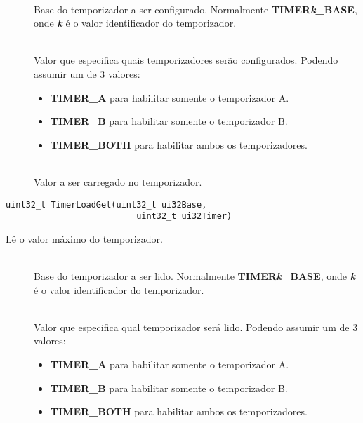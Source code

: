 \begin{description}
	\item []\hfill \\
	Base do temporizador a ser configurado. Normalmente \textbf{TIMER\emph{k}\_BASE}, onde \textbf{\emph{k}} é o valor identificador do temporizador.
	
	\item []\hfill \\
	Valor que especifica quais temporizadores serão configurados. Podendo assumir um de 3 valores:
	\begin{itemize}
		\item \textbf{TIMER\_A} para habilitar somente o temporizador A.
		\item \textbf{TIMER\_B} para habilitar somente o temporizador B.
		\item \textbf{TIMER\_BOTH} para habilitar ambos os temporizadores.
	\end{itemize}
	
	\item []\hfill \\
	Valor a ser carregado no temporizador.
\end{description}

\begin{lstlisting}[style=funcao]
	uint32_t TimerLoadGet(uint32_t ui32Base,
						  uint32_t ui32Timer)
\end{lstlisting}

Lê o valor máximo do temporizador.

\begin{description}
	\item []\hfill \\
	Base do temporizador a ser lido. Normalmente \textbf{TIMER\emph{k}\_BASE}, onde \textbf{\emph{k}} é o valor identificador do temporizador.
	
	\item []\hfill \\
	Valor que especifica qual temporizador será lido. Podendo assumir um de 3 valores:
	\begin{itemize}
		\item \textbf{TIMER\_A} para habilitar somente o temporizador A.
		\item \textbf{TIMER\_B} para habilitar somente o temporizador B.
		\item \textbf{TIMER\_BOTH} para habilitar ambos os temporizadores.
	\end{itemize}
\end{description}

